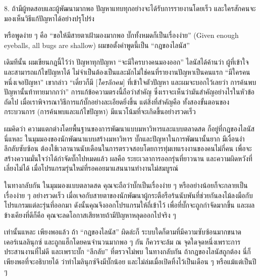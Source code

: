 \begin{fancyquotes}
  8. ถ้ามีผู้ทดสอบและผู้พัฒนามากพอ
  ปัญหาแทบทุกอย่างจะได้รับการรายงานโดยเร็ว
  และใครสักคนจะมองเห็นวิธีแก้ปัญหาได้อย่างปรุโปร่ง
\end{fancyquotes}

หรือพูดง่าย  ๆ   คือ ``ขอให้มีสายตาเฝ้ามองมากพอ
บั๊กทั้งหมดก็เป็นเรื่องง่าย'' (Given enough eyeballs, all bugs are
shallow) ผมขอตั้งคำพูดนี้เป็น ``กฎของไลนัส''

เดิมทีนั้น ผมเขียนกฎนี้ไว้ว่า ปัญหาทุกปัญหา ``จะมีใครบางคนมองออก''
ไลนัสได้ค้านว่า ผู้ที่เข้าใจและสามารถแก้ไขปัญหาได้
ไม่จำเป็นต้องเป็นและมักไม่ใช่คนที่รายงานปัญหาเป็นคนแรก
``มีใครคนหนึ่งเจอปัญหา'' เขากล่าว ``เดี๋ยวก็มี {[}\emph{ใครอีกคน}{]}
ที่เข้าใจตัวปัญหา และผมจะบอกไว้เลยว่า การค้นพบปัญหานั้นท้าทายมากกว่า''
การแก้ข้อความตรงนี้ถือว่าสำคัญ
ซึ่งเราจะเห็นว่ามันสำคัญอย่างไรในหัวข้อถัดไป
เมื่อเราพิจารณาวิธีการแก้บั๊กอย่างละเอียดยิ่งขึ้น แต่สิ่งที่สำคัญคือ
ทั้งสองขั้นตอนของกระบวนการ (การค้นพบและแก้ไขปัญหา)
มีแนวโน้มที่จะเกิดขึ้นอย่างรวดเร็ว

ผมคิดว่า ความแตกต่างโดยพื้นฐานของการพัฒนาแบบมหาวิหารและแบบตลาดสด
ก็อยู่ที่กฎของไลนัสนี่แหละ ในมุมมองของนักพัฒนาแบบสร้างมหาวิหาร
บั๊กและปัญหาในการพัฒนานั้นยาก มีเงื่อนงำ ลึกลับซับซ้อน
ต้องใช้เวลานานนับเดือนในการตรวจสอบโดยการทุ่มเทแรงงานของคนไม่กี่คน
เพื่อจะสร้างความมั่นใจว่าได้กำจัดบั๊กไปหมดแล้ว ผลคือ
ระยะเวลาการออกรุ่นที่ยาวนาน และความผิดหวังที่เลี่ยงไม่ได้
เมื่อโปรแกรมรุ่นใหม่ที่รอคอยมาแสนนานทำงานไม่สมบูรณ์

ในทางกลับกัน ในมุมมองแบบตลาดสด คุณจะถือว่าบั๊กเป็นเรื่องง่าย  ๆ
หรืออย่างน้อยก็จะกลายเป็นเรื่องง่าย  ๆ   อย่างรวดเร็ว
เมื่อเจอกับสายตาของนักพัฒนาผู้กระตือรือร้นนับพันที่ช่วยกันลงไม้ลงมือกับโปรแกรมแต่ละรุ่นที่ออกมา
ดังนั้นคุณจึงออกโปรแกรมให้ถี่เข้าไว้ เพื่อที่บั๊กจะถูกกำจัดมากขึ้น
และผลข้างเคียงที่ดีก็คือ คุณจะลดโอกาสเสียหายถ้ามีปัญหาหลุดออกไปจริง  ๆ

เท่านั้นแหละ เพียงพอแล้ว ถ้า ``กฎของไลนัส'' ผิดล่ะก็
ระบบใดก็ตามที่มีความซับซ้อนมากขนาดเคอร์เนลลินุกซ์
และถูกแฮ็กโดยคนจำนวนมากพอ  ๆ   กัน ก็ควรจะล้ม ณ
จุดใดจุดหนึ่งเพราะการประสานงานที่ไม่ดี และเพราะบั๊ก ``ลึกลับ''
ที่ตรวจไม่พบ ในทางกลับกัน ถ้ากฎของไลนัสถูกต้อง
นี่ก็เพียงพอที่จะอธิบายได้ ว่าทำไมลินุกซ์จึงมีบั๊กน้อย
และไม่ล่มเมื่อเปิดทิ้งไว้เป็นเดือน  ๆ   หรือแม้แต่เป็นปี  ๆ


